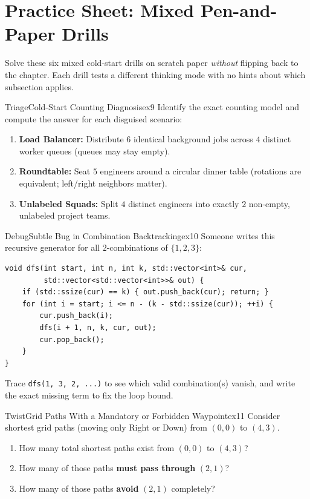 \documentclass[11pt,a4paper]{article}
\theoremstyle{definition}
\begin{document}
\section*{Practice Sheet: Mixed Pen-and-Paper Drills}

\noindent
Solve these six mixed cold-start drills on scratch paper \emph{without} flipping back to the chapter. Each drill tests a different thinking mode with no hints about which subsection applies.

\begin{tryitbox}{Triage}{Cold-Start Counting Diagnosis}{ex9}
Identify the exact counting model and compute the answer for each disguised scenario:
\begin{enumerate}
    \item \textbf{Load Balancer:} Distribute $6$ identical background jobs across $4$ distinct worker queues (queues may stay empty).
    \item \textbf{Roundtable:} Seat $5$ engineers around a circular dinner table (rotations are equivalent; left/right neighbors matter).
    \item \textbf{Unlabeled Squads:} Split $4$ distinct engineers into exactly $2$ non-empty, unlabeled project teams.
\end{enumerate}
\end{tryitbox}

\begin{tryitbox}{Debug}{Subtle Bug in Combination Backtracking}{ex10}
Someone writes this recursive generator for all $2$-combinations of $\{1, 2, 3\}$:
\begin{lstlisting}[numbers=none, xleftmargin=4pt, framexleftmargin=4pt]
void dfs(int start, int n, int k, std::vector<int>& cur,
         std::vector<std::vector<int>>& out) {
    if (std::ssize(cur) == k) { out.push_back(cur); return; }
    for (int i = start; i <= n - (k - std::ssize(cur)); ++i) {
        cur.push_back(i);
        dfs(i + 1, n, k, cur, out);
        cur.pop_back();
    }
}
\end{lstlisting}
Trace \texttt{dfs(1, 3, 2, ...)} to see which valid combination(s) vanish, and write the exact missing term to fix the loop bound.
\end{tryitbox}

\begin{tryitbox}{Twist}{Grid Paths With a Mandatory or Forbidden Waypoint}{ex11}
Consider shortest grid paths (moving only Right or Down) from $(0, 0)$ to $(4, 3)$.
\begin{enumerate}
    \item How many total shortest paths exist from $(0, 0)$ to $(4, 3)$?
    \item How many of those paths \textbf{must pass through} $(2, 1)$?
    \item How many of those paths \textbf{avoid} $(2, 1)$ completely?
\end{enumerate}
\end{tryitbox}
\end{document}
